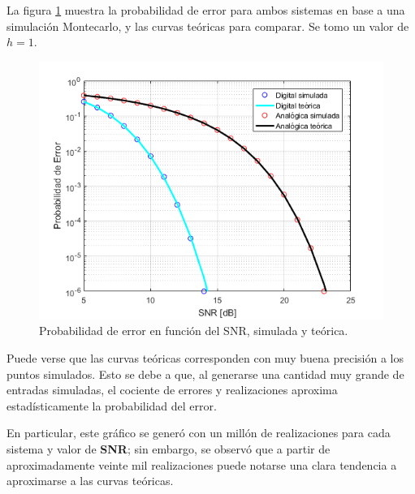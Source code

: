 La figura \ref{fig:mc_h1} muestra la probabilidad de error para ambos sistemas en base a una simulación Montecarlo, y las curvas teóricas para comparar. Se tomo un valor de $h=1$.

\begin{figure}[H]
    \centering
    \includegraphics[width=\textwidth]{./Matlab/ej4h=1n=1meg.png}
    \caption{Probabilidad de error en función del SNR, simulada y teórica. }
\label{fig:mc_h1}
\end{figure}

Puede verse que las curvas teóricas corresponden con muy buena precisión a los puntos simulados. Esto se debe a que, al generarse una cantidad muy grande de entradas simuladas, el cociente de errores y realizaciones aproxima estadísticamente la probabilidad del error.

En particular, este gráfico se generó con un millón de realizaciones para cada sistema y valor de \textbf{SNR}; sin embargo, se observó que a partir de aproximadamente veinte mil realizaciones puede notarse una clara tendencia a aproximarse a las curvas teóricas. 